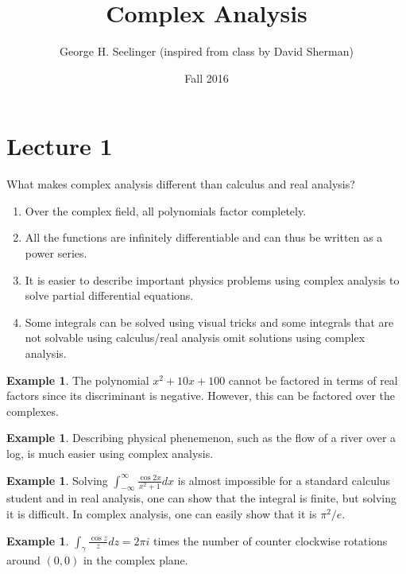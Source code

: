 \documentclass[11pt,leqno,oneside]{amsart}
\title[Complex Analysis]{Complex Analysis}
\author{George H. Seelinger (inspired from class by David Sherman)}
\date{Fall 2016}
\theoremstyle{definition}
\newtheorem{example}[thm]{Example}
\numberwithin{equation}{section}
\begin{document}
\maketitle
\section{Lecture 1}
What makes complex analysis different than calculus and real analysis?

\begin{enumerate}
    \item Over the complex field, all polynomials factor completely.
    \item All the functions are infinitely differentiable and can thus be written as a power series.
    \item It is easier to describe important physics problems using complex analysis to solve partial differential equations.
    \item Some integrals can be solved using visual tricks and some integrals that are not solvable using calculus/real analysis omit solutions using complex analysis.

\end{enumerate}
\begin{example}
    The polynomial $x^2+10x+100$ cannot be factored in terms of real factors since its discriminant is negative. However, this can be factored over the complexes.
\end{example}
\begin{example}
    Describing physical phenemenon, such as the flow of a river over a log, is much easier using complex analysis.
\end{example}
\begin{example}
    Solving $\int_{-\infty}^{\infty} \frac{\cos 2x}{x^2+1} dx$ is almost impossible for a standard calculus student and in real analysis, one can show that the integral is finite, but solving it is difficult. In complex analysis, one can easily show that it is $\pi^2/e$. 
\end{example}
\begin{example}
    $\int_{\gamma} \frac{\cos z}{z} dz = 2 \pi i $ times the number of counter clockwise rotations around $(0,0)$ in the complex plane.
\end{example}
\end{document}
